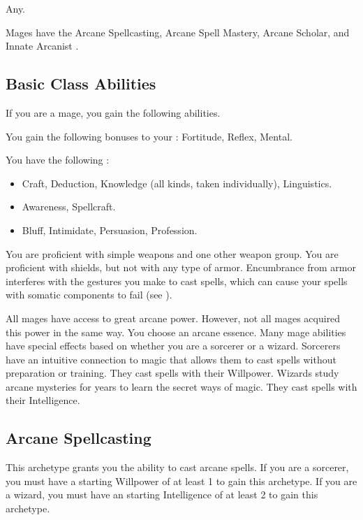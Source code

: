      Any.

     Mages have the Arcane Spellcasting, Arcane Spell Mastery, Arcane Scholar, and Innate Arcanist .

    \subsection{Basic Class Abilities}
        If you are a mage, you gain the following abilities.

        You gain the following bonuses to your :  Fortitude,  Reflex,  Mental.

        You have the following :
        \begin{itemize}
            \item {} Craft, Deduction, Knowledge (all kinds, taken individually), Linguistics.
            \item {} Awareness, Spellcraft.
            \item {} Bluff, Intimidate, Persuasion, Profession.
        \end{itemize}

        You are proficient with simple weapons and one other weapon group.
        You are proficient with shields, but not with any type of armor.
        Encumbrance from armor interferes with the gestures you make to cast spells, which can cause your spells with somatic components to fail (see ).

        All mages have access to great arcane power.
        However, not all mages acquired this power in the same way.
        You choose an arcane essence.
        Many mage abilities have special effects based on whether you are a sorcerer or a wizard.
         Sorcerers have an intuitive connection to magic that allows them to cast spells without preparation or training.
        They cast spells with their Willpower.
         Wizards study arcane mysteries for years to learn the secret ways of magic.
        They cast spells with their Intelligence.

    \subsection{Arcane Spellcasting}
        This archetype grants you the ability to cast arcane spells.
        If you are a sorcerer, you must have a starting Willpower of at least 1 to gain this archetype.
        If you are a wizard, you must have an starting Intelligence of at least 2 to gain this archetype.

